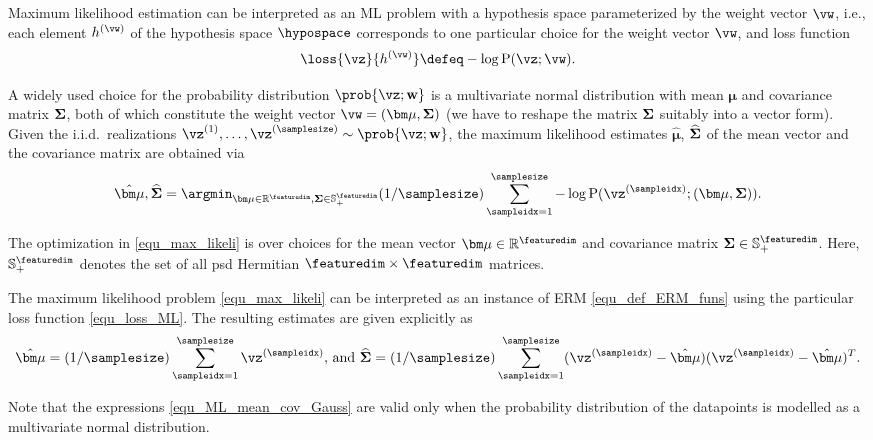 \documentclass[12pt]{report}
\newcommand{\featurelen}{\featuredim}
\begin{document}
Maximum likelihood estimation can be interpreted as an ML problem with a hypothesis space 
parameterized by the weight vector $\vw$, i.e., each element $h^{(\vw)}$ of the hypothesis 
space $\hypospace$ corresponds to one particular choice for the 
weight vector $\vw$, and loss function 
\begin{equation} 
\label{equ_loss_ML}
\loss{\vz}{h^{(\vw)}} \defeq - \log {\rm P} (\vz; \vw). 
\end{equation} 

A widely used choice for the probability distribution $\prob{\vz; \mathbf{w}}$ is a multivariate normal 
distribution with mean ${\bm \mu}$ and covariance matrix ${\bf \Sigma}$, both of which constitute the 
weight vector $\vw = ({\bm \mu}, {\bf \Sigma})$ (we have to reshape the matrix ${\bf \Sigma}$ suitably 
into a vector form). Given the i.i.d.\ realizations $\vz^{(1)},\ldots,\vz^{(\samplesize)} \sim \prob{\vz; \mathbf{w}}$,  
the maximum likelihood estimates $\hat{\bm \mu}$, $\widehat{\bf \Sigma}$ of the mean vector and 
the covariance matrix are obtained via 
\begin{equation}
\label{equ_max_likeli}
\hat{\bm \mu}, \widehat{\bf \Sigma} = \argmin_{{\bm \mu} \in \mathbb{R}^{\featurelen},{\bf \Sigma} \in \mathbb{S}^{\featurelen}_{+}} (1/\samplesize) \sum_{\sampleidx=1}^{\samplesize} - \log {\rm P} (\vz^{(\sampleidx)}; ({\bm \mu},{\bf \Sigma})). 
\end{equation} 

The optimization in \eqref{equ_max_likeli} is over choices for the mean 
vector ${\bm \mu} \in \mathbb{R}^{\featurelen}$ and covariance matrix 
${\bf \Sigma} \in \mathbb{S}^{\featurelen}_{+}$. Here, $\mathbb{S}^{\featurelen}_{+}$ 
denotes the set of all psd Hermitian $\featurelen \times \featurelen$ matrices. 

The maximum likelihood problem \eqref{equ_max_likeli} can be 
interpreted as an instance of ERM \eqref{equ_def_ERM_funs} using the 
particular loss function \eqref{equ_loss_ML}. The resulting estimates are 
given explicitly as 
\begin{equation}
\label{equ_ML_mean_cov_Gauss} 
\hat{\bm \mu} = (1/\samplesize) \sum_{\sampleidx=1}^{\samplesize} \vz^{(\sampleidx)} \mbox{, and } \widehat{\bf \Sigma} = (1/\samplesize) \sum_{\sampleidx=1}^{\samplesize} (\vz^{(\sampleidx)} - \hat{\bm \mu})(\vz^{(\sampleidx)} - \hat{\bm \mu})^{T}.
\end{equation} 

Note that the expressions \eqref{equ_ML_mean_cov_Gauss} 
are valid only when the probability distribution of the datapoints is 
modelled as a multivariate normal distribution. 
\end{document}
